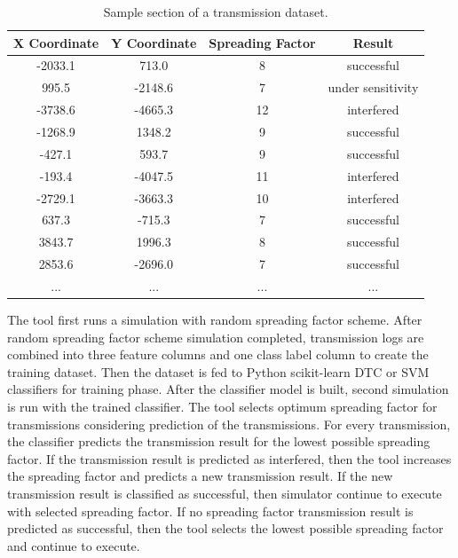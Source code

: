 \begin{table}
\centering
\caption{Sample section of a transmission dataset.}
\label{table:dataset}
\begin{tabular}{|c|c|c|c|}
\hline
\textbf{X Coordinate} & \textbf{Y Coordinate} & \textbf{Spreading Factor} & \textbf{Result} \\ \hline
      -2033.1  &  713.0  &   8   &   successful \\ \hline
       995.5   & -2148.6 &   7   &   under sensitivity \\ \hline
      -3738.6  & -4665.3 &   12  &   interfered \\ \hline
      -1268.9  &  1348.2 &   9   &   successful \\ \hline
      -427.1   &  593.7  &   9   &   successful \\ \hline
      -193.4   & -4047.5 &   11  &   interfered \\ \hline
      -2729.1  & -3663.3 &   10  &   interfered \\ \hline
       637.3   & -715.3 &   7   &   successful \\ \hline
       3843.7  &  1996.3 &   8   &   successful \\ \hline
       2853.6  & -2696.0 &   7   &   successful \\ \hline
      ...      & ...     &   ... &   ... \\ \hline
\end{tabular}
\end{table}

The tool first runs a simulation with random spreading factor scheme. After random spreading factor scheme simulation completed, transmission logs are combined into three feature columns and one class label column to create the training dataset. Then the dataset is fed to Python scikit-learn DTC or SVM classifiers for training phase. After the classifier model is built, second simulation is run with the trained classifier. The tool selects optimum spreading factor for transmissions considering prediction of the transmissions. For every transmission, the classifier predicts the transmission result for the lowest possible spreading factor. If the transmission result is predicted as interfered, then the tool increases the spreading factor and predicts a new transmission result. If the new transmission result is classified as successful, then simulator continue to execute with selected spreading factor. If no spreading factor transmission result is predicted as successful, then the tool selects the lowest possible spreading factor and continue to execute.
